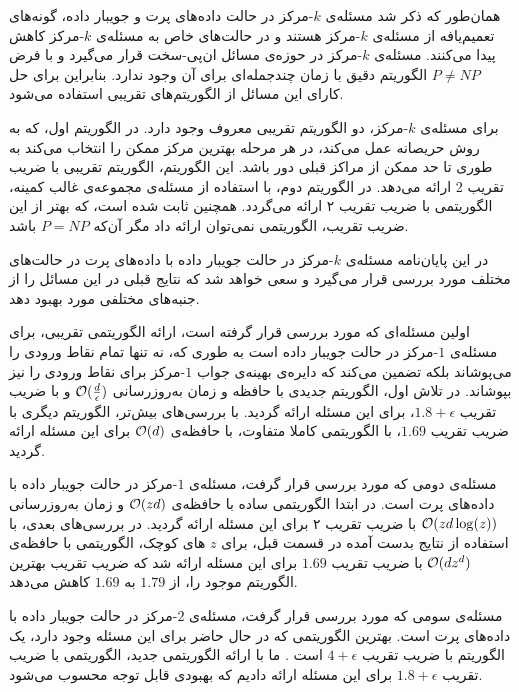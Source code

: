 
همان‌طور که ذکر شد مسئله‌ی $k$-مرکز در حالت داده‌های پرت و جویبار داده، گونه‌های تعمیم‌یافه از مسئله‌ی $k$-مرکز هستند و در حالت‌های خاص به مسئله‌ی $k$-مرکز کاهش پیدا می‌کنند. مسئله‌ی $k$-مرکز در حوزه‌ی مسائل ان‌پی-سخت قرار می‌گیرد و با فرض $P \neq NP$ الگوریتم دقیق با زمان چندجمله‌ای برای آن وجود ندارد. بنابراین برای حل کارای این مسائل از الگوریتم‌های تقریبی  استفاده می‌شود.

برای مسئله‌ی $k$-مرکز، دو الگوریتم تقریبی معروف وجود دارد.
در الگوریتم اول، که به روش حریصانه عمل می‌کند، در هر مرحله بهترین مرکز ممکن را انتخاب می‌کند به طوری تا حد ممکن از مراکز‌ قبلی دور باشد. این الگوریتم، الگوریتم تقریبی با ضریب تقریب 2 ارائه می‌دهد.
در الگوریتم دوم، با استفاده از مسئله‌ی مجموعه‌ی غالب کمینه، الگوریتمی با ضریب تقریب ۲ ارائه می‌گردد.
همچنین ثابت شده است، که بهتر از این ضریب تقریب، الگوریتمی نمی‌توان ارائه داد مگر آن‌که $P = NP$ باشد.



در این پایان‌نامه مسئله‌ی $k$-مرکز  در حالت جویبار داده با داده‌های پرت در حالت‌های مختلف مورد بررسی قرار می‌گیرد و سعی خواهد شد که نتایج قبلی در این مسائل را از جنبه‌های مختلفی مورد بهبود دهد.

اولین مسئله‌ای که مورد بررسی قرار گرفته است، ارائه الگوریتمی تقریبی، برای مسئله‌ی $1$-مرکز در حالت جویبار داده است به طوری که، نه تنها تمام نقاط ورودی را می‌پوشاند بلکه تضمین می‌کند که دایره‌ی بهینه‌‌ی جواب $1$-مرکز برای نقاط ورودی را نیز‌ بپوشاند. در تلاش‌ اول، الگوریتم جدیدی با حافظه‌ و زمان به‌روزرسانی $\mathcal{O}(\frac{d}{\epsilon})$ و  با ضریب تقریب $1.8 + \epsilon$، برای این مسئله ارائه گردید. با بررسی‌های بیش‌تر، الگوریتم دیگری با ضریب تقریب $1.69$، با الگوریتمی کاملا متفاوت، با حافظه‌ی $\mathcal{O}(d)$ برای این مسئله ارائه گردید.

مسئله‌ی دومی که مورد بررسی قرار گرفت، مسئله‌ی $1$-مرکز‌ در حالت جویبار داده با داده‌های پرت است. در ابتدا الگوریتمی ساده با حافظه‌ی $\mathcal{O}(zd)$ و زمان به‌روزرسانی $\mathcal{O}(zd\log(z))$ با ضریب تقریب ۲ برای این مسئله ارائه گردید. در بررسی‌های بعدی، با استفاده از‌ نتایج بدست آمده در قسمت قبل، برای $z$ های کوچک، الگوریتمی با حافظه‌ی $\mathcal{O}(dz^d)$ با ضریب تقریب $1.69$ برای این مسئله ارائه شد که ضریب تقریب بهترین الگوریتم موجود را، از $1.79$ به $1.69$ کاهش می‌دهد.

مسئله‌ی سومی که مورد بررسی قرار گرفت، مسئله‌ی $2$-مرکز در حالت جویبار داده با داده‌های پرت است. بهترین الگوریتمی که در حال حاضر برای این مسئله وجود دارد، یک الگوریتم با ضریب تقریب $4 + \epsilon$ است . ما با ارائه‌ الگوریتمی جدید، الگوریتمی با ضریب تقریب $1.8 + \epsilon$ برای این مسئله ارائه دادیم که بهبودی قابل توجه محسوب می‌شود.
 

